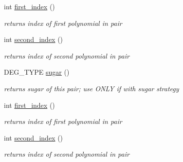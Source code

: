 \begin{Indent}
\begin{DoxyCompactItemize}
\mbox{\label{group___g_b_computation_ac163e7707177e0c8566903ffdedea821}} 
int \hyperlink{group___g_b_computation_ac163e7707177e0c8566903ffdedea821}{first\+\_\+index} ()
\begin{DoxyCompactList}\small\item\em returns index of first polynomial in pair \end{DoxyCompactList}\item 
\mbox{\label{group___g_b_computation_a201f10149987060902a3999e4db201b9}} 
int \hyperlink{group___g_b_computation_a201f10149987060902a3999e4db201b9}{second\+\_\+index} ()
\begin{DoxyCompactList}\small\item\em returns index of second polynomial in pair \end{DoxyCompactList}\item 
\mbox{\label{group___g_b_computation_a85d34fcde810b942744433d1311ac331}} 
D\+E\+G\+\_\+\+T\+Y\+PE \hyperlink{group___g_b_computation_a85d34fcde810b942744433d1311ac331}{sugar} ()
\begin{DoxyCompactList}\small\item\em returns sugar of this pair; use O\+N\+LY if with sugar strategy \end{DoxyCompactList}\item 
\mbox{\label{group___g_b_computation_ac163e7707177e0c8566903ffdedea821}} 
int \hyperlink{group___g_b_computation_ac163e7707177e0c8566903ffdedea821}{first\+\_\+index} ()
\begin{DoxyCompactList}\small\item\em returns index of first polynomial in pair \end{DoxyCompactList}\item 
\mbox{\label{group___g_b_computation_a201f10149987060902a3999e4db201b9}} 
int \hyperlink{group___g_b_computation_a201f10149987060902a3999e4db201b9}{second\+\_\+index} ()
\begin{DoxyCompactList}\small\item\em returns index of second polynomial in pair \end{DoxyCompactList}\item 
\mbox{\label{group___g_b_computation_a85d34fcde810b942744433d1311ac331}} 

\end{DoxyCompactItemize}
\end{Indent}
